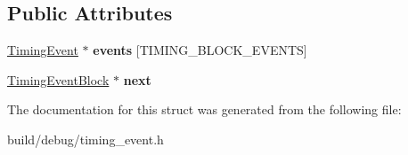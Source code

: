 \subsection*{Public Attributes}
\begin{DoxyCompactItemize}
\item 
\hypertarget{structTimingEventBlock_a546c2515140557d550f623a20fdcb75f}{\hyperlink{classTimingEvent}{Timing\-Event} $\ast$ {\bfseries events} \mbox{[}T\-I\-M\-I\-N\-G\-\_\-\-B\-L\-O\-C\-K\-\_\-\-E\-V\-E\-N\-T\-S\mbox{]}}\label{structTimingEventBlock_a546c2515140557d550f623a20fdcb75f}

\item 
\hypertarget{structTimingEventBlock_aa5f3bb22d692ee018be8074ab5b80be8}{\hyperlink{structTimingEventBlock}{Timing\-Event\-Block} $\ast$ {\bfseries next}}\label{structTimingEventBlock_aa5f3bb22d692ee018be8074ab5b80be8}

\end{DoxyCompactItemize}


The documentation for this struct was generated from the following file\-:\begin{DoxyCompactItemize}
\item 
build/debug/timing\-\_\-event.\-h\end{DoxyCompactItemize}
